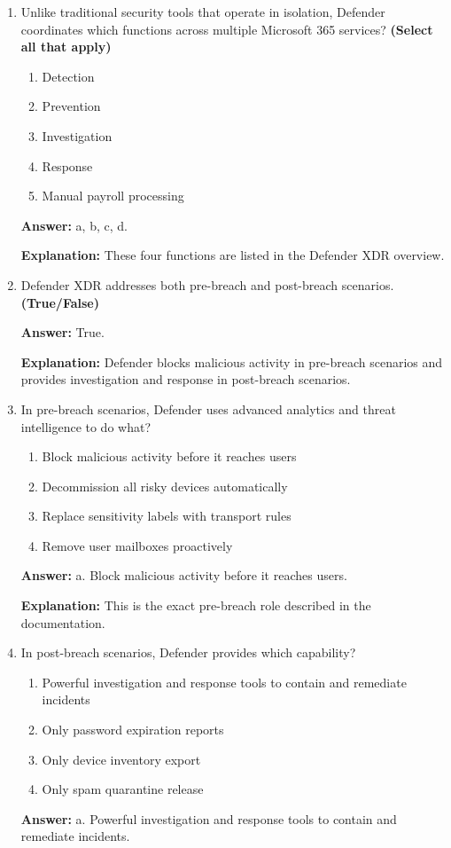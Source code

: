 \documentclass[10pt]{article}
\begin{document}
\begin{enumerate}[leftmargin=*]
\textbf{Explanation:} Microsoft Defender XDR using this exact description.

\item Unlike traditional security tools that operate in isolation, Defender coordinates which functions across multiple Microsoft 365 services? \textbf{(Select all that apply)}
\begin{enumerate}[label=\alph*., leftmargin=1.5em]
\item Detection
\item Prevention
\item Investigation
\item Response
\item Manual payroll processing
\end{enumerate}
\textbf{Answer:} a, b, c, d.

\textbf{Explanation:} These four functions are listed in the Defender XDR overview.

\item Defender XDR addresses both pre-breach and post-breach scenarios. \textbf{(True/False)}

\textbf{Answer:} True.

\textbf{Explanation:} Defender blocks malicious activity in pre-breach scenarios and provides investigation and response in post-breach scenarios.

\item In pre-breach scenarios, Defender uses advanced analytics and threat intelligence to do what?
\begin{enumerate}[label=\alph*., leftmargin=1.5em]
\item Block malicious activity before it reaches users
\item Decommission all risky devices automatically
\item Replace sensitivity labels with transport rules
\item Remove user mailboxes proactively
\end{enumerate}
\textbf{Answer:} a. Block malicious activity before it reaches users.

\textbf{Explanation:} This is the exact pre-breach role described in the documentation.

\item In post-breach scenarios, Defender provides which capability?
\begin{enumerate}[label=\alph*., leftmargin=1.5em]
\item Powerful investigation and response tools to contain and remediate incidents
\item Only password expiration reports
\item Only device inventory export
\item Only spam quarantine release
\end{enumerate}
\textbf{Answer:} a. Powerful investigation and response tools to contain and remediate incidents.


\end{enumerate}
\end{document}
